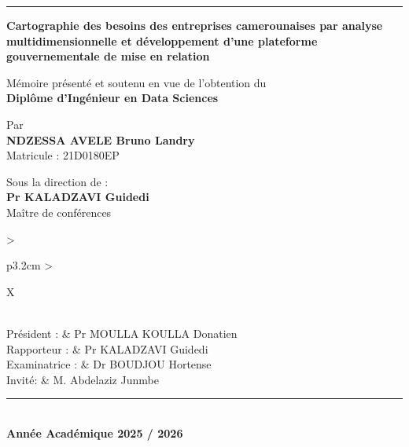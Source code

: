 \documentclass[12pt, a4paper, oneside]{report}
\newcommand{\auteur}{NDZESSA AVELE Bruno Landry}
\newcommand{\matricule}{21D0180EP}
\newcommand{\annee}{2025 / 2026}
\newcommand{\titredoc}{Cartographie des besoins des entreprises camerounaises par analyse multidimensionnelle et développement d'une plateforme gouvernementale de mise en relation}
\begin{document}
\begin{titlepage}
\begin{center}
			\vspace{0.15cm}
			\textcolor{primary}{\rule{\linewidth}{1.5pt}}
			\vspace{0.5cm}
			
			\begin{tcolorbox}[
				colback=primary!6, colframe=primary,
				arc=5pt, boxrule=1pt,
				left=12pt, right=12pt, top=10pt, bottom=10pt
				]
				\centering
				{\large\bfseries\color{primary} \titredoc}
			\end{tcolorbox}
			
			\vspace{0.45cm}
			
			{\normalsize Mémoire présenté et soutenu en vue de l'obtention du}\\[5pt]
			{\large\bfseries\color{primary} Diplôme d'Ingénieur  en Data Sciences}
			
			\vspace{0.45cm}
			
			{\normalsize Par }\\[5pt]
			{\large\bfseries \auteur}\\[3pt]
			{\small Matricule : \matricule}
			
			\vspace{0.4cm}
			
			{\normalsize Sous la direction de :}\\[5pt]
			{\large\bfseries\color{primary} Pr KALADZAVI Guidedi}\\[2pt]
			{\small Ma\^itre de conférences}
			
			\vspace{0.4cm}
			
			\begin{tabularx}{\textwidth}{>{\bfseries\raggedright\arraybackslash}p{3.2cm}
					>{\raggedright\arraybackslash}X}
				\\[6pt]
				Président :    & Pr MOULLA KOULLA Donatien \\[4pt]
				Rapporteur :   & Pr KALADZAVI Guidedi \\[4pt]
				Examinatrice : & Dr BOUDJOU Hortense \\[4pt]
				Invité: & M. Abdelaziz Junmbe
			\end{tabularx}
			
			\vfill
			
			\textcolor{primary}{\rule{\linewidth}{1pt}}\\[5pt]
			{\bfseries Année Académique \annee}
			
		\end{center}
		\restoregeometry
	\end{titlepage}
\end{document}
